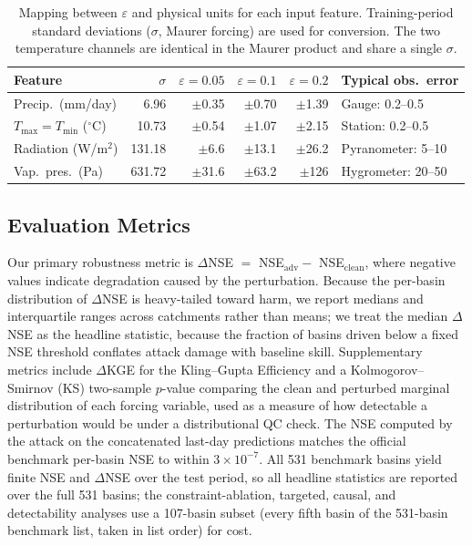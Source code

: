\documentclass[final]{agujournal2019}
\begin{document}
\begin{table}[ht]
\caption{Mapping between $\varepsilon$ and physical units for each input feature. Training-period standard deviations ($\sigma$, Maurer forcing) are used for conversion. The two temperature channels are identical in the Maurer product and share a single $\sigma$.}
\label{tab:epsilon}
\centering
\small
\begin{tabular}{lrrrrl}
\toprule
Feature & $\sigma$ & $\varepsilon{=}0.05$ & $\varepsilon{=}0.1$ & $\varepsilon{=}0.2$ & Typical obs.\ error \\
\midrule
Precip.\ (mm/day) & 6.96 & $\pm$0.35 & $\pm$0.70 & $\pm$1.39 & Gauge: 0.2--0.5 \\
$T_{\max}{=}T_{\min}$ ($^\circ$C) & 10.73 & $\pm$0.54 & $\pm$1.07 & $\pm$2.15 & Station: 0.2--0.5 \\
Radiation (W/m$^2$) & 131.18 & $\pm$6.6 & $\pm$13.1 & $\pm$26.2 & Pyranometer: 5--10 \\
Vap.\ pres.\ (Pa) & 631.72 & $\pm$31.6 & $\pm$63.2 & $\pm$126 & Hygrometer: 20--50 \\
\bottomrule
\end{tabular}
\end{table}

\subsection{Evaluation Metrics}

Our primary robustness metric is $\Delta$NSE $=$ NSE$_{\mathrm{adv}} -$ NSE$_{\mathrm{clean}}$, where negative values indicate degradation caused by the perturbation. Because the per-basin distribution of $\Delta$NSE is heavy-tailed toward harm, we report medians and interquartile ranges across catchments rather than means; we treat the median $\Delta$NSE as the headline statistic, because the fraction of basins driven below a fixed NSE threshold conflates attack damage with baseline skill. Supplementary metrics include $\Delta$KGE for the Kling--Gupta Efficiency and a Kolmogorov--Smirnov (KS) two-sample $p$-value comparing the clean and perturbed marginal distribution of each forcing variable, used as a measure of how detectable a perturbation would be under a distributional QC check. The NSE computed by the attack on the concatenated last-day predictions matches the official benchmark per-basin NSE to within $3\times10^{-7}$. All 531 benchmark basins yield finite NSE and $\Delta$NSE over the test period, so all headline statistics are reported over the full 531 basins; the constraint-ablation, targeted, causal, and detectability analyses use a 107-basin subset (every fifth basin of the 531-basin benchmark list, taken in list order) for cost.
\end{document}
